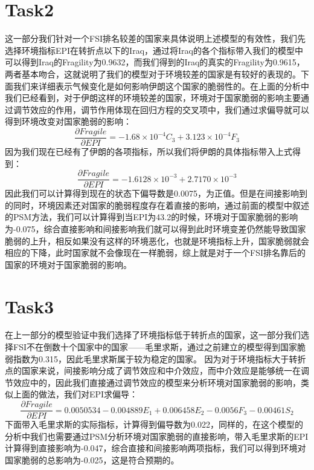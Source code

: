 {\section{Task2}
这一部分我们针对一个FSI排名较差的国家来具体说明上述模型的有效性，我们先选择环境指标EPI在转折点以下的Iraq，通过将Iraq的各个指标带入我们的模型中可以得到Iraq的Fragility为0.9632，而我们得到的Iraq的真实的Fragility为0.9615，两者基本吻合，这就说明了我们的模型对于环境较差的国家是有较好的表现的。下面我们来详细表示气候变化是如何影响伊朗这个国家的脆弱性的。在上面的分析中我们已经看到，对于伊朗这样的环境较差的国家，环境对于国家脆弱的影响主要通过调节效应的作用，调节作用体现在回归方程的交叉项中，我们通过求偏导就可以得到环境改变对国家脆弱的影响：
$$\frac{\partial{Fragile}}{\partial{EPI}} = -1.68 \times 10^{-4} C_3 + 3.123 \times 10^{-4}F_3$$
因为我们现在已经有了伊朗的各项指标，所以我们将伊朗的具体指标带入上式得到：
$$\frac{\partial{Fragile}}{\partial{EPI}} = -1.6128\times 10^{-3} +2.7170 \times 10^{-3}$$
因此我们可以计算得到现在的状态下偏导数是0.0075，为正值。但是在间接影响到的同时，环境因素还对国家的脆弱程度存在着直接的影响，通过前面的模型中叙述的PSM方法，我们可以计算得到当EPI为43.2的时候，环境对于国家脆弱的影响为-0.075，综合直接影响和间接影响我们就可以得到此时环境变差仍然能导致国家脆弱的上升，相反如果没有这样的环境恶化，也就是环境指标上升，国家脆弱就会相应的下降，此时国家就不会像现在一样脆弱，综上就是对于一个FSI排名靠后的国家的环境对于国家脆弱的影响。

\section{Task3}
在上一部分的模型验证中我们选择了环境指标低于转折点的国家，这一部分我们选择FSI不在倒数十个国家中的国家——毛里求斯，通过之前建立的模型得到国家脆弱指数为0.315，因此毛里求斯属于较为稳定的国家。
因为对于环境指标大于转折点的国家来说，间接影响分成了调节效应和中介效应，而中介效应是能够统一在调节效应中的，因此我们直接通过调节效应的模型来分析环境对国家脆弱的影响，类似上面的做法，我们对EPI求偏导：
$$\frac{\partial{Fragile}}{\partial{EPI}} = 0.0050534 - 0.004889E_1 +0.006458E_2 - 0.0056F_3 - 0.00461S_2$$
下面带入毛里求斯的实际指标，计算得到偏导数为0.022，同样的，在这个模型的分析中我们也需要通过PSM分析环境对国家脆弱的直接影响，带入毛里求斯的EPI计算得到直接影响为-0.047，综合直接和间接影响两项指标，我们可以得到环境对国家脆弱的总影响为-0.025，这是符合预期的。

}